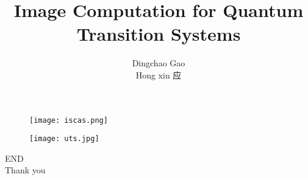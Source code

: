\documentclass[aspectratio=1610]{ctexbeamer}
\title[TDD in quantum]{Image Computation for Quantum Transition Systems}
\author[Gcc]{Dingchao Gao\\Hong xin 应}
\begin{document}
\begin{frame}[plain]
  \titlepage
  \begin{figure}
    \centering
    \begin{minipage}[t]{0.48\textwidth}
    \centering
    \texttt{[image: iscas.png]}
    \end{minipage}
    \begin{minipage}[t]{0.48\textwidth}
    \centering
    \texttt{[image: uts.jpg]}
    \end{minipage}
  \end{figure}
\end{frame}

\begin{frame}
\centering
\Huge{END\\Thank you}
\end{frame}
\end{document}
